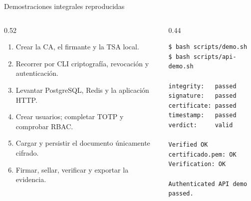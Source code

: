 \documentclass[aspectratio=169,11pt]{beamer}
\begin{document}
\begin{frame}[fragile]{Demostraciones integrales reproducidas}
  \begin{columns}[T,onlytextwidth]
    \begin{column}{0.52\textwidth}
      \small
      \begin{enumerate}
        \item Crear la CA, el firmante y la TSA local.
        \item Recorrer por CLI criptografía, revocación y autenticación.
        \item Levantar PostgreSQL, Redis y la aplicación HTTP.
        \item Crear usuarios; completar TOTP y comprobar RBAC.
        \item Cargar y persistir el documento únicamente cifrado.
        \item Firmar, sellar, verificar y exportar la evidencia.
      \end{enumerate}
    \end{column}
    \begin{column}{0.44\textwidth}
      \begin{lstlisting}[style=terminal]
$ bash scripts/demo.sh
$ bash scripts/api-demo.sh

integrity:   passed
signature:   passed
certificate: passed
timestamp:   passed
verdict:     valid

Verified OK
certificado.pem: OK
Verification: OK

Authenticated API demo passed.
      \end{lstlisting}
    \end{column}
  \end{columns}
\end{frame}
\end{document}
